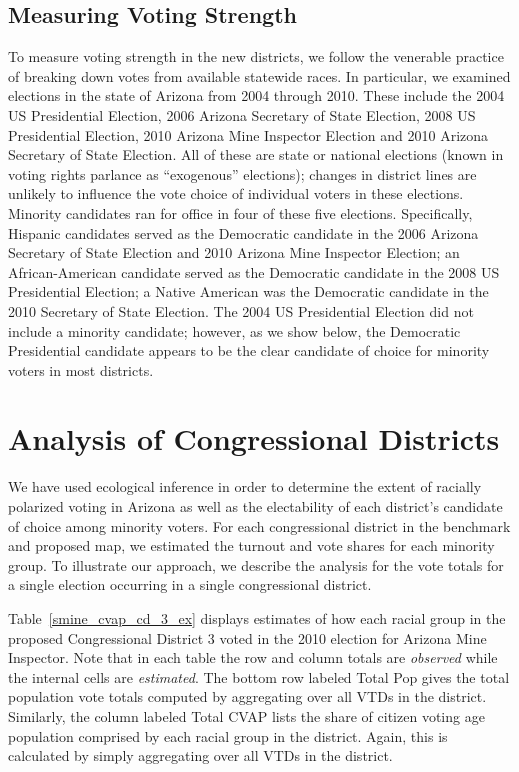 \documentclass[12pt]{scrartcl}
\begin{document}
\subsection{Measuring Voting Strength}

To measure voting strength in the new districts, we follow the
venerable practice of breaking down votes from available statewide
races.  In particular, we examined elections in the state of Arizona
from 2004 through 2010. These include the 2004 US Presidential
Election, 2006 Arizona Secretary of State Election, 2008 US
Presidential Election, 2010 Arizona Mine Inspector Election and 2010
Arizona Secretary of State Election.  All of these are state or
national elections (known in voting rights parlance as ``exogenous''
elections); changes in district lines are unlikely to influence the
vote choice of individual voters in these elections. Minority
candidates ran for office in four of these five elections.
Specifically, Hispanic candidates served as the Democratic candidate
in the 2006 Arizona Secretary of State Election and 2010 Arizona Mine
Inspector Election; an African-American candidate served as the
Democratic candidate in the 2008 US Presidential Election; a Native
American was the Democratic candidate in the 2010 Secretary of State
Election. The 2004 US Presidential Election did not include a minority
candidate; however, as we show below, the Democratic Presidential
candidate appears to be the clear candidate of choice for minority
voters in most districts.

\section{Analysis of Congressional Districts}

We have used ecological inference in order to determine the extent of
racially polarized voting in Arizona as well as the electability of
each district's candidate of choice among minority voters. For each
congressional district in the benchmark and proposed map, we estimated
the turnout and vote shares for each minority group. To illustrate our
approach, we describe the analysis for the vote totals for a single
election occurring in a single congressional district.

Table~\ref{smine_cvap_cd_3_ex} displays estimates of how each racial
group in the proposed Congressional District 3 voted in the 2010
election for Arizona Mine Inspector. Note that in each table the row
and column totals are {\it observed} while the internal cells are {\it
  estimated}. The bottom row labeled Total Pop gives the total
population vote totals computed by aggregating over all VTDs in the
district. Similarly, the column labeled Total CVAP lists the share of
citizen voting age population comprised by each racial group in the
district. Again, this is calculated by simply aggregating over all
VTDs in the district.
\end{document}
